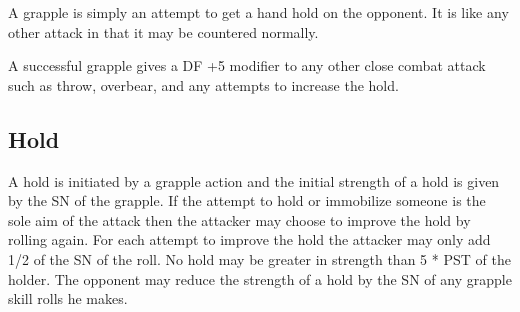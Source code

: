 A grapple is simply an attempt to get a hand hold on the opponent.
It is like any other attack in that it may be countered normally.

A successful grapple gives a DF +5 modifier to any other close combat
attack such as throw, overbear, and any attempts to increase the hold.

\subsection{Hold}

A hold is initiated by a grapple action and the initial strength of a
hold is given by the SN of the grapple. If the attempt to hold or
immobilize someone is the sole aim of the attack then the attacker
may choose to improve the hold by rolling again. For each attempt to
improve the hold the attacker may only add 1/2 of the SN of the roll.
No hold may be greater in strength than 5 * PST of the holder.
The opponent may reduce the strength of a hold by the SN of any
grapple skill rolls he makes.

